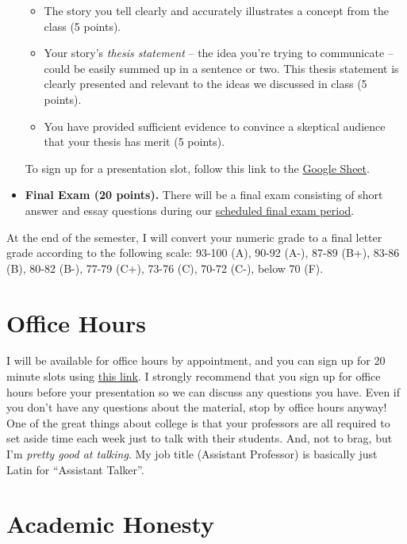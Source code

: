 \documentclass[11pt, letterpaper]{article}
\begin{document}
\begin{itemize}
\begin{itemize}
		\item The story you tell clearly and accurately illustrates a concept from the class (5 points).
		\item Your story's \textit{thesis statement} -- the idea you're trying to communicate -- could be easily summed up in a sentence or two. This thesis statement is clearly presented and relevant to the ideas we discussed in class (5 points).
		\item You have provided sufficient evidence to convince a skeptical audience that your thesis has merit (5 points).
	\end{itemize}
	To sign up for a presentation slot, follow this link to the \href{https://docs.google.com/spreadsheets/d/12a5mE-qxsg_m47bSt2t3PnnQu6zLRQ9DePzw3ObePRc/edit?usp=sharing}{Google Sheet}.
	
	\item \textbf{Final Exam (20 points).} There will be a final exam consisting of short answer and essay questions during our \href{https://reg.uga.edu/general-information/calendars/final-exam-schedule/}{scheduled final exam period}.
\end{itemize}

\noindent At the end of the semester, I will convert your numeric grade to a final letter grade according to the following scale: 93-100 (A), 90-92 (A-), 87-89 (B+), 83-86 (B), 80-82 (B-), 77-79 (C+), 73-76 (C), 70-72 (C-), below 70 (F).

\section*{Office Hours}

I will be available for office hours by appointment, and you can sign up for 20 minute slots using \href{https://calendly.com/joeornstein/20min}{this link}. I strongly recommend that you sign up for office hours before your presentation so we can discuss any questions you have. Even if you don't have any questions about the material, stop by office hours anyway! One of the great things about college is that your professors are all required to set aside time each week just to talk with their students. And, not to brag, but I'm \textit{pretty good at talking}. My job title (Assistant Professor) is basically just Latin for ``Assistant Talker''.


\section*{Academic Honesty}
\end{document}

